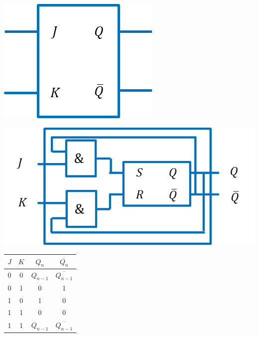 \documentclass[10pt]{article}
\begin{document}
  \vspace{.2cm}
\hfill
\begin{minipage}[c]{.15\linewidth}
\begin{center}
\includegraphics[width=\textwidth]{images/basculeJK}
\end{center}
\end{minipage} \hfill
\begin{minipage}[c]{.4\linewidth}
\begin{center}
\includegraphics[width=\textwidth]{images/basculeJK_logi}
\end{center}

\end{minipage} \hfill
\begin{minipage}[c]{.35\linewidth}

\begin{center}
\begin{tabular}{|c|c||c|c|}
\hline
$J$ & $K$ &  $Q_n$ & $\overline{Q_{n}}$ \\
\hline \hline
0 & 0 & $Q_{n-1}$ & $\overline{Q_{n-1}}$ \\ \hline
0 & 1 & 0 & 1 \\\hline
1 & 0 & 1 & 0 \\\hline
1 & 1 & 0 & 0 \\\hline
1 & 1 & $Q_{n-1}$ & $\overline{Q_{n-1}}$ \\\hline
\end{tabular}
\end{center}
\end{minipage}\hfill
\end{document}
